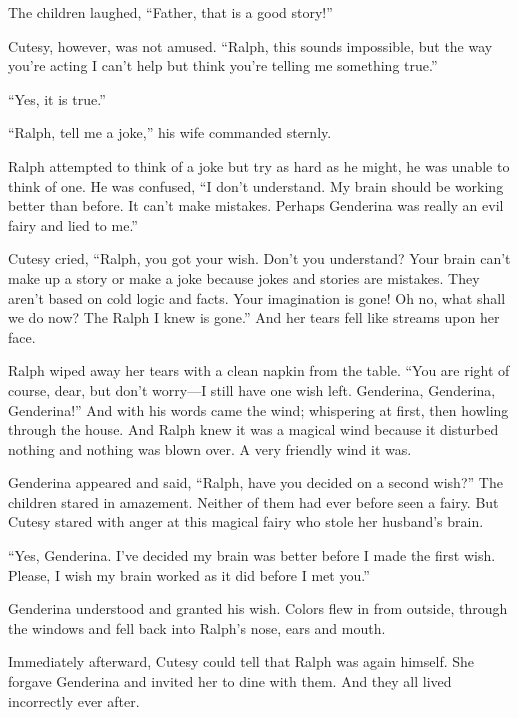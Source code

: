 The children laughed, “Father, that is a good story!”

Cutesy, however, was not amused. “Ralph, this sounds impossible, but the way you're acting I can't help but think you're telling me something true.”

“Yes, it is true.”

“Ralph, tell me a joke,” his wife commanded sternly.

Ralph attempted to think of a joke but try as hard as he might, he was unable to think of one. He was confused, “I don't understand. My brain should be working better than before. It can't make mistakes. Perhaps Genderina was really an evil fairy and lied to me.”

Cutesy cried, “Ralph, you got your wish. Don't you understand? Your brain can't make up a story or make a joke because jokes and stories are mistakes. They aren't based on cold logic and facts. Your imagination is gone! Oh no, what shall we do now? The Ralph I knew is gone.” And her tears fell like streams upon her face.

Ralph wiped away her tears with a clean napkin from the table. “You are right of course, dear, but don't worry—I still have one wish left. Genderina, Genderina, Genderina!” And with his words came the wind; whispering at first, then howling through the house. And Ralph knew it was a magical wind because it disturbed nothing and nothing was blown over. A very friendly wind it was.

Genderina appeared and said, “Ralph, have you decided on a second wish?” The children stared in amazement. Neither of them had ever before seen a fairy. But Cutesy stared with anger at this magical fairy who stole her husband's brain.

“Yes, Genderina. I've decided my brain was better before I made the first wish. Please, I wish my brain worked as it did before I met you.”

Genderina understood and granted his wish. Colors flew in from outside, through the windows and fell back into Ralph's nose, ears and mouth.

Immediately afterward, Cutesy could tell that Ralph was again himself. She forgave Genderina and invited her to dine with them. And they all lived incorrectly ever after.